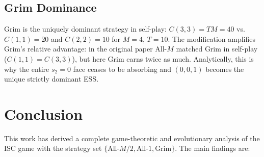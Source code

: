 \documentclass[12pt,a4paper]{article}
\begin{document}
\subsection{Grim Dominance}

Grim is the uniquely dominant strategy in self-play: $C(3,3)=TM=40$ vs.\
$C(1,1)=20$ and $C(2,2)=10$ for $M=4$, $T=10$. The modification amplifies
Grim's relative advantage: in the original paper All-$M$ matched Grim in
self-play ($C(1,1)=C(3,3)$), but here Grim earns twice as much. Analytically,
this is why the entire $s_2=0$ face ceases to be absorbing and $(0,0,1)$ becomes
the unique strictly dominant ESS.

\section{Conclusion}
\label{sec:conclusion}

This work has derived a complete game-theoretic and evolutionary analysis of the
ISC game with the strategy set $\{\text{All-}M/2, \text{All-}1, \text{Grim}\}$.
The main findings are:
\end{document}
